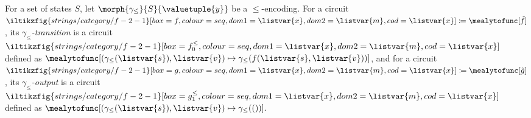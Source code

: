 \begin{definition}[Translations]
    For a set of states \(S\), let \(\morph{\gamma_\leq}{S}{\valuetuple{y}}\) be
    a \(\leq\)-encoding.
    For a circuit \(
        \iltikzfig{strings/category/f-2-1}[box=f, colour=seq, dom1=\listvar{x}, dom2=\listvar{m}, cod=\listvar{x}]
        \coloneqq
        \mealytofunc[\hat{f}]
    \), its \emph{\(\gamma_\leq\)-transition} is a circuit \(
        \iltikzfig{strings/category/f-2-1}[box=f^\leq_0, colour=seq, dom1=\listvar{x}, dom2=\listvar{m}, cod=\listvar{x}]
    \) defined as \(
        \mealytofunc[
            \left(\gamma_\leq(\listvar{s}),\listvar{v}\right)
            \mapsto \gamma_\leq(f(\listvar{s}, \listvar{v}))
        ]
    \), and for a circuit \(
        \iltikzfig{strings/category/f-2-1}[box=g, colour=seq, dom1=\listvar{x}, dom2=\listvar{m}, cod=\listvar{x}]
        \coloneqq
        \mealytofunc[\hat{g}]
    \), its \emph{\(\gamma_\leq\)-output} is a circuit \(
        \iltikzfig{strings/category/f-2-1}[box=g^\leq_1, colour=seq, dom1=\listvar{x}, dom2=\listvar{m}, cod=\listvar{x}]
    \) defined as \(
        \mealytofunc[
            \left(\gamma_\leq(\listvar{s}),\listvar{v}\right)
            \mapsto \gamma_\leq(())
        ].
    \)
\end{definition}

